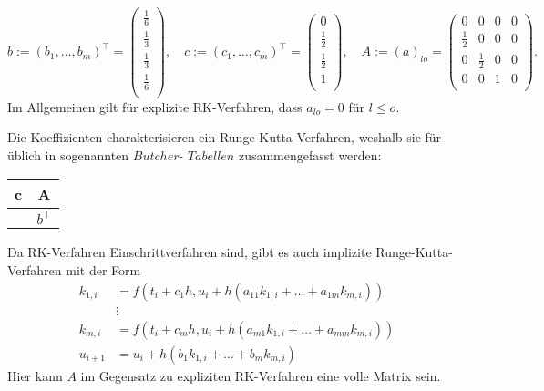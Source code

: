 \[
    b := \left( b_1, \dots , b_m \right)^{\intercal}
    =\left( \begin{matrix}
                \frac{1}{6}\\
                \frac{1}{3}\\
                \frac{1}{3}\\
                \frac{1}{6}\\
    \end{matrix}\right), \quad
    c := \left( c_1, \dots, c_m \right)^{\intercal}
    = \left( \begin{matrix}
                 0\\
                 \frac{1}{2}\\
                 \frac{1}{2}\\
                 1\\
    \end{matrix} \right), \quad
    A:=(a)_{lo} = \left( \begin{matrix}
                             0 & 0 & 0 & 0\\
                             \frac{1}{2} & 0 & 0 & 0 \\
                             0 & \frac{1}{2} & 0 & 0 \\
                             0 & 0 & 1 & 0\\
    \end{matrix} \right).
\]
Im Allgemeinen gilt für explizite RK-Verfahren, dass $a_{lo} = 0$ für $l \leq o$.\\
\begin{bem}
    Die Koeffizienten charakterisieren ein Runge-Kutta-Verfahren, weshalb sie für üblich in sogenannten
    $Butcher$- $Tabellen$ zusammengefasst werden:
    \begin{center}
        \begin{tabular}{c | c}
            c & A \\
            \hline
            & $b^{\intercal}$
        \end{tabular}
    \end{center}
\end{bem}
Da RK-Verfahren Einschrittverfahren sind, gibt es auch implizite Runge-Kutta-Verfahren mit der Form
\begin{align*}
    k_{1,i} &= f(t_i+c_1h, u_i + h(a_{11}k_{1,i} + \dots + a_{1m} k_{m,i})) \\
    &\vdots\\
    k_{m,i} &= f(t_i+c_mh, u_i + h(a_{m1}k_{1,i} + \dots + a_{mm} k_{m,i}))\\
    u_{i+1} &= u_i + h(b_1 k_{1,i} + \dots + b_m k_{m,i})
\end{align*}
Hier kann $A$ im Gegensatz zu expliziten RK-Verfahren eine volle Matrix sein.


